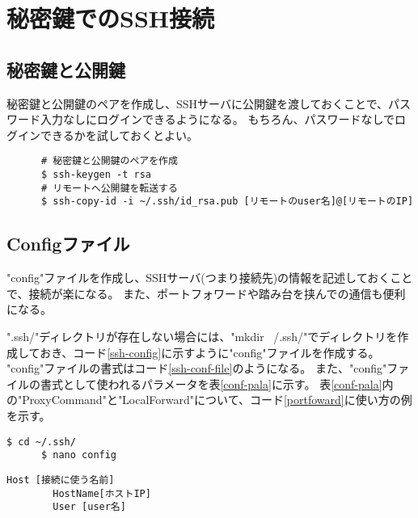 \documentclass[a4paper,10pt]{jsarticle}
\begin{document}
\section{秘密鍵でのSSH接続}
  \subsection{秘密鍵と公開鍵}
    秘密鍵と公開鍵のペアを作成し、SSHサーバに公開鍵を渡しておくことで、パスワード入力なしにログインできるようになる。
    もちろん、パスワードなしでログインできるかを試しておくとよい。

    \begin{lstlisting}
      # 秘密鍵と公開鍵のペアを作成
      $ ssh-keygen -t rsa
      # リモートへ公開鍵を転送する
      $ ssh-copy-id -i ~/.ssh/id_rsa.pub [リモートのuser名]@[リモートのIP]
    \end{lstlisting}
  
  \subsection{Configファイル}
    "config"ファイルを作成し、SSHサーバ(つまり接続先)の情報を記述しておくことで、接続が楽になる。
    また、ポートフォワードや踏み台を挟んでの通信も便利になる。
    
    ".ssh/"ディレクトリが存在しない場合には、"mkdir ~/.ssh/"でディレクトリを作成しておき、コード\ref{ssh-config}に示すように"config"ファイルを作成する。
    "config"ファイルの書式はコード\ref{ssh-conf-file}のようになる。
    また、"config"ファイルの書式として使われるパラメータを表\ref{conf-pala}に示す。
    表\ref{conf-pala}内の"ProxyCommand"と"LocalForward"について、コード\ref{portfoward}に使い方の例を示す。

    \begin{lstlisting}[caption=configファイルの作成,label=ssh-config]
      $ cd ~/.ssh/
      $ nano config
    \end{lstlisting}


    \begin{lstlisting}[caption=configファイルの書式,label=ssh-conf-file]
      Host [接続に使う名前]
        HostName[ホストIP]
        User [user名]
    \end{lstlisting}
\end{document}
